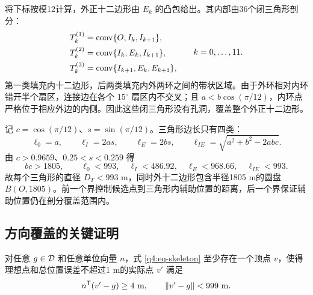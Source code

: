 将下标按模12计算，外正十二边形由 $E_k$ 的凸包给出。其内部由36个闭三角形剖分：
\begin{equation}
\begin{aligned}
 T_k^{(1)}&=\operatorname{conv}\{O,I_k,I_{k+1}\},\\
 T_k^{(2)}&=\operatorname{conv}\{I_k,E_k,I_{k+1}\},\\
 T_k^{(3)}&=\operatorname{conv}\{I_{k+1},E_k,E_{k+1}\},
 \end{aligned}
\qquad k=0,\ldots,11.
\label{q4:eq-triangles}
\end{equation}
第一类填充内十二边形，后两类填充内外两环之间的带状区域。由于外环相对内环错开半个扇区，连接边在各个 $15^\circ$ 扇区内不交叉；且 $a<b\cos(\pi/12)$，内环点严格位于相应外边的内侧。因此这些闭三角形没有孔洞，覆盖整个外正十二边形。

记 $c=\cos(\pi/12)$、$s=\sin(\pi/12)$。三角形边长只有四类：
\begin{equation}
 \ell_0=a,\qquad \ell_I=2as,\qquad \ell_E=2bs,\qquad
 \ell_{IE}=\sqrt{a^2+b^2-2ab c}.
 \label{q4:eq-lengths}
\end{equation}
由 $c>0.9659$、$0.25<s<0.259$ 得
\begin{equation}
 bc>1805,\qquad
 \ell_0<993,\quad \ell_I<486.92,\quad \ell_E<968.66,
 \quad \ell_{IE}<993.
 \label{q4:eq-bounds}
\end{equation}
故每个三角形的直径 $D_T<993$ m，同时外十二边形包含半径1805 m的圆盘 $B(O,1805)$。前一个界控制候选点到三角形内辅助位置的距离，后一个界保证辅助位置仍在剖分覆盖范围内。

\subsection{方向覆盖的关键证明}

\begin{theorem}[25点的方向鲁棒覆盖]\label{new:thm-direction-cover}
对任意 $g\in\mathcal D$ 和任意单位向量 $n$，式 \eqref{q4:eq-skeleton} 至少存在一个顶点 $v$，使得理想点和总位置误差不超过1 m的实际点 $v'$ 满足
\begin{equation}
 n^{\mathsf T}(v'-g)\ge4\ {\rm m},\qquad \left\lVert v'-g\right\rVert<999\ {\rm m}.
 \label{q4:eq-direction-margin}
\end{equation}
\end{theorem}

